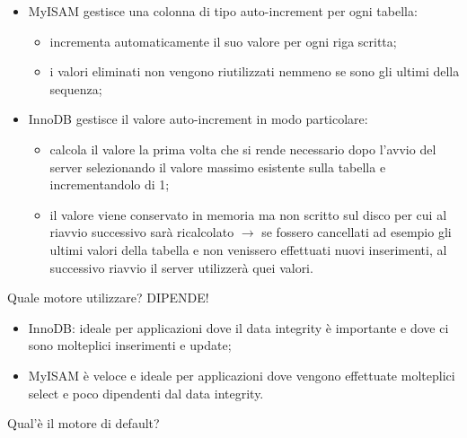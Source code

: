 \begin{itemize}

\item MyISAM gestisce una colonna di tipo auto-increment per ogni tabella:

\begin{itemize}

\item incrementa automaticamente il suo valore per ogni riga scritta;
\item i valori eliminati non vengono riutilizzati nemmeno se sono gli ultimi della sequenza;

\end{itemize}

\item InnoDB gestisce il valore auto-increment in modo particolare:

\begin{itemize}

\item calcola il valore la prima volta che si rende necessario dopo l’avvio del server selezionando il valore massimo esistente sulla tabella e incrementandolo di 1;
\item il valore viene conservato in memoria ma non scritto sul disco per cui al riavvio successivo sarà ricalcolato $\rightarrow$ se fossero cancellati ad esempio gli ultimi valori della tabella e non venissero effettuati nuovi inserimenti, al successivo riavvio il server utilizzerà quei valori.

\end{itemize}

\end{itemize}

Quale motore utilizzare? DIPENDE! 

\begin{itemize}

\item{InnoDB}: ideale per applicazioni dove il data integrity è importante e dove ci sono molteplici inserimenti e update;
\item{MyISAM} è veloce e ideale per applicazioni dove vengono effettuate molteplici select e poco dipendenti dal data integrity.

\end{itemize}

Qual'è il motore di default? 

